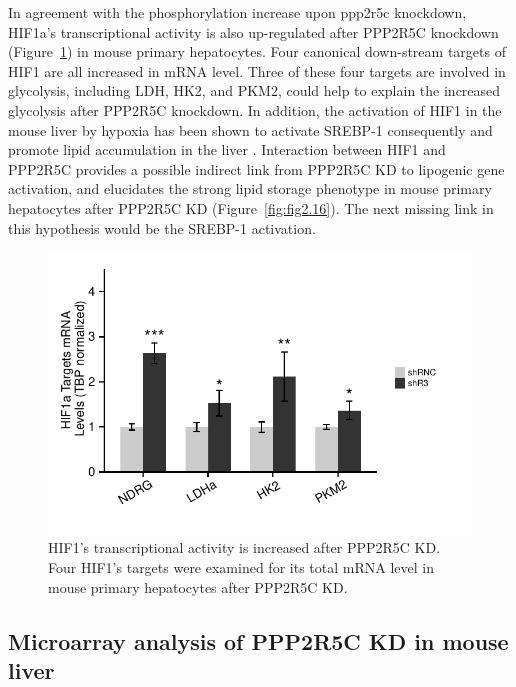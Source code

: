 In agreement with the phosphorylation increase upon \gls{ppp2r5c} knockdown, \gls{HIF1a}'s transcriptional activity is also up-regulated after PPP2R5C knockdown (Figure~\ref{fig:fig2.53}) in mouse primary hepatocytes. Four canonical down-stream targets of HIF1\textalpha{} are all increased in mRNA level. Three of these four targets are involved in glycolysis, including LDH\textalpha{}, HK2, and PKM2, could help to explain the increased glycolysis after PPP2R5C knockdown. In addition, the activation of HIF1\textalpha{} in the mouse liver by hypoxia has been shown to activate SREBP-1 consequently and promote lipid accumulation in the liver \cite{li_intermittent_2005}. Interaction between HIF1\textalpha{} and PPP2R5C provides a possible indirect link from PPP2R5C KD to lipogenic gene activation, and elucidates the strong lipid storage phenotype in mouse primary hepatocytes after PPP2R5C KD (Figure~\ref{fig:fig2.16}). The next missing link in this hypothesis would be the SREBP-1 activation.

\begin{figure}[!tbp]
\centering
\includegraphics[width=1\textwidth]{figs/fig2-53 hif target 1st hepa.pdf}
\caption[HIF1\textalpha's transcriptional activity increases upon PPP2R5C KD]{\footnotesize HIF1\textalpha{}'s transcriptional activity is increased after PPP2R5C KD. Four HIF1\textalpha{}'s targets were examined for its total mRNA level in mouse primary hepatocytes after PPP2R5C KD.}
\label{fig:fig2.53}
\end{figure}

\subsection{Microarray analysis of PPP2R5C KD in mouse liver}\label{sec:sec254}

